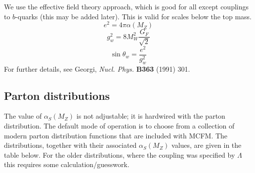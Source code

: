 \documentclass[12pt]{article}
\begin{document}
We use the effective field theory approach, which is good for all
except couplings to $b$-quarks (this may be added later). This is
valid for scales below the top mass.
      $$e^2 =  4 \pi \alpha(M_Z)$$
      $$g_w^2 =  8 M^2_W  \frac{G_F}{\sqrt{2}} $$
      $$\sin \theta_w =  \frac{e^2}{g_w^2}$$
For further details, see Georgi, {\it Nucl. Phys.} {\bf B363} (1991)
301. 

\subsection{Parton distributions}
The value of $\alpha_S(M_Z)$ is not adjustable; it is hardwired with the
parton distribution. The default mode of operation is to choose from a
collection of modern parton distribution functions that are included with
MCFM.  The distributions, together with their associated $\alpha_S(M_Z)$
values, are given in the table below. For the older distributions, where the
coupling was specified by $\Lambda$ this requires some calculation/guesswork.
\end{document}
